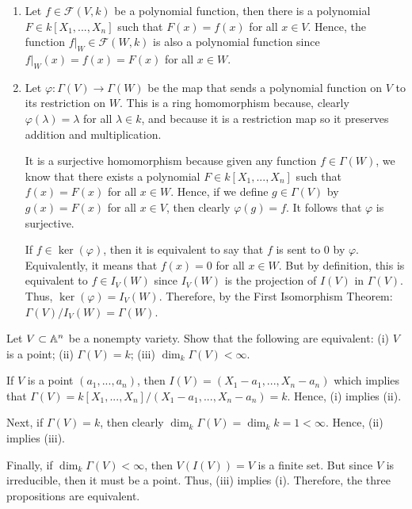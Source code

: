 \begin{solution}
    \begin{enumerate}[label=(\alph*)]
        \item Let $f \in \mathcal{F}(V,k)$ be a polynomial function, then there is a polynomial $F \in k[X_1, ..., X_n]$ such that $F(x) = f(x)$ for all $x \in V$. Hence, the function $f|_W \in \mathcal{F}(W,k)$ is also a polynomial function since $f|_W(x) = f(x) = F(x)$ for all $x \in W$.
        \item Let $\varphi : \Gamma(V) \to \Gamma(W)$ be the map that sends a polynomial function on $V$ to its restriction on $W$. This is a ring homomorphism because, clearly $\varphi(\lambda) = \lambda$ for all $\lambda \in k$, and because it is a restriction map so it preserves addition and multiplication.
        
        It is a surjective homomorphism because given any function $f \in \Gamma(W)$, we know that there exists a polynomial $F \in k[X_1, ..., X_n]$ such that $f(x) = F(x)$ for all $x \in W$. Hence, if we define $g \in \Gamma(V)$ by $g(x) = F(x)$ for all $x \in V$, then clearly $\varphi(g) = f$. It follows that $\varphi$ is surjective.
        
        If $f \in \ker(\varphi)$, then it is equivalent to say that $f$ is sent to 0 by $\varphi$. Equivalently, it means that $f(x) = 0$ for all $x \in W$. But by definition, this is equivalent to $f \in I_V(W)$ since $I_V(W)$ is the projection of $I(V)$ in $\Gamma(V)$. Thus, $\ker(\varphi) = I_V(W)$. Therefore, by the First Isomorphism Theorem: $\Gamma(V)/ I_V(W) = \Gamma(W)$.  \\
    \end{enumerate}
\end{solution}

\begin{exercise}
    Let $V \subset \mathbb{A}^n$ be a nonempty variety. Show that the following are equivalent: (i) $V$ is a point; (ii) $\Gamma(V) = k$; (iii) $\dim_k\Gamma(V) < \infty$. \\
\end{exercise}

\begin{solution}
    If $V$ is a point $(a_1, ..., a_n)$, then $I(V) = (X_1 - a_1, ..., X_n - a_n)$ which implies that $\Gamma(V) = k[X_1, ..., X_n] / (X_1 - a_1, ..., X_n - a_n) = k$. Hence, (i) implies (ii).
    
    Next, if $\Gamma(V) = k$, then clearly $\dim_k \Gamma(V) = \dim_k k = 1 < \infty$. Hence, (ii) implies (iii).
    
    Finally, if $\dim_k \Gamma(V) < \infty$, then $V(I(V)) = V$ is a finite set. But since $V$ is irreducible, then it must be a point. Thus, (iii) implies (i). Therefore, the three propositions are equivalent. \\
\end{solution}

